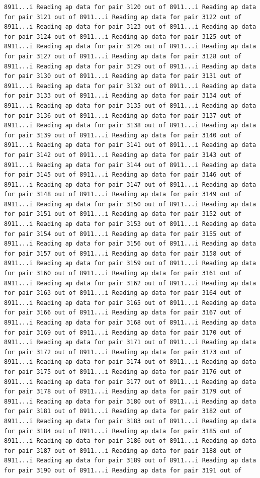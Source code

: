 \documentclass[
]{article}
\begin{document}
\begin{verbatim}
8911...i Reading ap data for pair 3120 out of 8911...i Reading ap data for pair 3121 out of 8911...i Reading ap data for pair 3122 out of 8911...i Reading ap data for pair 3123 out of 8911...i Reading ap data for pair 3124 out of 8911...i Reading ap data for pair 3125 out of 8911...i Reading ap data for pair 3126 out of 8911...i Reading ap data for pair 3127 out of 8911...i Reading ap data for pair 3128 out of 8911...i Reading ap data for pair 3129 out of 8911...i Reading ap data for pair 3130 out of 8911...i Reading ap data for pair 3131 out of 8911...i Reading ap data for pair 3132 out of 8911...i Reading ap data for pair 3133 out of 8911...i Reading ap data for pair 3134 out of 8911...i Reading ap data for pair 3135 out of 8911...i Reading ap data for pair 3136 out of 8911...i Reading ap data for pair 3137 out of 8911...i Reading ap data for pair 3138 out of 8911...i Reading ap data for pair 3139 out of 8911...i Reading ap data for pair 3140 out of 8911...i Reading ap data for pair 3141 out of 8911...i Reading ap data for pair 3142 out of 8911...i Reading ap data for pair 3143 out of 8911...i Reading ap data for pair 3144 out of 8911...i Reading ap data for pair 3145 out of 8911...i Reading ap data for pair 3146 out of 8911...i Reading ap data for pair 3147 out of 8911...i Reading ap data for pair 3148 out of 8911...i Reading ap data for pair 3149 out of 8911...i Reading ap data for pair 3150 out of 8911...i Reading ap data for pair 3151 out of 8911...i Reading ap data for pair 3152 out of 8911...i Reading ap data for pair 3153 out of 8911...i Reading ap data for pair 3154 out of 8911...i Reading ap data for pair 3155 out of 8911...i Reading ap data for pair 3156 out of 8911...i Reading ap data for pair 3157 out of 8911...i Reading ap data for pair 3158 out of 8911...i Reading ap data for pair 3159 out of 8911...i Reading ap data for pair 3160 out of 8911...i Reading ap data for pair 3161 out of 8911...i Reading ap data for pair 3162 out of 8911...i Reading ap data for pair 3163 out of 8911...i Reading ap data for pair 3164 out of 8911...i Reading ap data for pair 3165 out of 8911...i Reading ap data for pair 3166 out of 8911...i Reading ap data for pair 3167 out of 8911...i Reading ap data for pair 3168 out of 8911...i Reading ap data for pair 3169 out of 8911...i Reading ap data for pair 3170 out of 8911...i Reading ap data for pair 3171 out of 8911...i Reading ap data for pair 3172 out of 8911...i Reading ap data for pair 3173 out of 8911...i Reading ap data for pair 3174 out of 8911...i Reading ap data for pair 3175 out of 8911...i Reading ap data for pair 3176 out of 8911...i Reading ap data for pair 3177 out of 8911...i Reading ap data for pair 3178 out of 8911...i Reading ap data for pair 3179 out of 8911...i Reading ap data for pair 3180 out of 8911...i Reading ap data for pair 3181 out of 8911...i Reading ap data for pair 3182 out of 8911...i Reading ap data for pair 3183 out of 8911...i Reading ap data for pair 3184 out of 8911...i Reading ap data for pair 3185 out of 8911...i Reading ap data for pair 3186 out of 8911...i Reading ap data for pair 3187 out of 8911...i Reading ap data for pair 3188 out of 8911...i Reading ap data for pair 3189 out of 8911...i Reading ap data for pair 3190 out of 8911...i Reading ap data for pair 3191 out of 
\end{verbatim}
\end{document}
